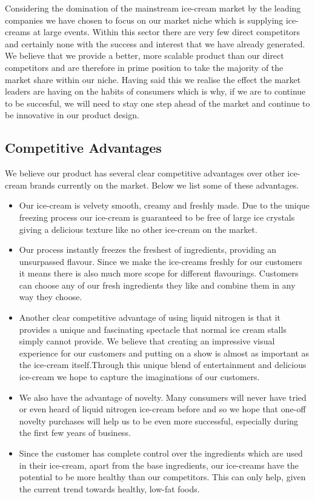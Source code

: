 \documentclass{article}
\begin{document}
  Considering the domination of the mainstream ice-cream market by the leading companies we have chosen to focus on our market niche which is supplying ice-creams at large events. Within this sector there are very few direct competitors and certainly none with the success and interest that we have already generated. We believe that we provide a better, more scalable product than our direct competitors and are therefore in prime position to take the majority of the market share within our niche. Having said this we realise the effect the market leaders are having on the habits of consumers which is why, if we are to continue to be succesful, we will need to stay one step ahead of the market and continue to be innovative in our product design.

\subsection{Competitive Advantages}

We believe our product has several clear competitive advantages over other ice-cream brands currently on the market. Below we list some of these advantages.

  \begin{itemize}
  \item Our ice-cream is velvety smooth, creamy and freshly made. Due to the unique freezing process our ice-cream is guaranteed to be free of large ice crystals giving a delicious texture like no other ice-cream on the market.

  \item Our process instantly freezes the freshest of ingredients, providing an unsurpassed flavour. Since we make the ice-creams freshly for our customers it means there is also much more scope for different flavourings. Customers can choose any of our fresh ingredients they like and combine them in any way they choose.

  \item Another clear competitive advantage of using liquid nitrogen is that it provides a unique and fascinating spectacle that normal ice cream stalls simply cannot provide. We believe that creating an impressive visual experience for our customers and putting on a show is almost as important as the ice-cream itself.Through this unique blend of entertainment and delicious ice-cream we hope to capture the imaginations of our customers.

  \item We also have the advantage of novelty. Many consumers will never have tried or even heard of liquid nitrogen ice-cream before and so we hope that one-off novelty purchases will help us to be even more successful, especially during the first few years of business.

  \item Since the customer has complete control over the ingredients which are used in their ice-cream, apart from the base ingredients, our ice-creams have the potential to be more healthy than our competitors. This can only help, given the current trend towards healthy, low-fat foods.
  \end{itemize}
\end{document}
